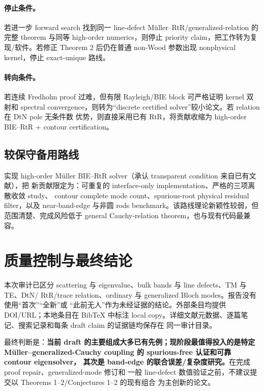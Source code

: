 \documentclass[UTF8,11pt,fontset=none]{ctexart}
\begin{document}
\paragraph{停止条件。}
若进一步 forward search 找到同一 line-defect Müller--RtR/generalized-relation 的完整
theorem 与同等 high-order numerics，则停止 priority claim，把工作转为复现/软件。若修正
Theorem 2 后仍在普通 non-Wood 参数出现 nonphysical kernel，停止 exact-unique 路线。

\paragraph{转向条件。}
若连续 Fredholm proof 过难，但有限 Rayleigh/BIE block 可严格证明 kernel 双射和 spectral
convergence，则转为“discrete certified solver”较小论文。若 relation 在 DtN pole 无条件数
优势，则直接采用已有 RtR，将贡献收缩为 high-order BIE--RtR + contour certification。

\subsection{较保守备用路线}

实现 high-order Müller BIE--RtR solver（承认 transparent condition 来自已有文献），把
新贡献限定为：可重复的 interface-only implementation、严格的三项离散收敛 study、
contour complete mode count、spurious-root physical residual filter，以及 near-band-edge
与非圆 rods benchmark。该路线理论新颖性较弱，但范围清楚、完成风险低于 general
Cauchy-relation theorem，也与现有代码最兼容。

\section{质量控制与最终结论}

本次审计已区分 scattering 与 eigenvalue、bulk bands 与 line defects、TM 与 TE、DtN/
RtR/trace relation、ordinary 与 generalized Bloch modes。报告没有使用“首次”“全新”或
“此前无人”作为未经证据的结论。外部条目均提供 DOI/URL；本地条目在 BibTeX 中标注
local copy。详细文献元数据、逐篇笔记、搜索记录和每条 draft claim 的证据链均保存在
同一审计目录。

最终判断是：\textbf{当前 draft 的主要组成大多已有先例；现阶段最值得投入的是特定
Müller--\allowbreak generalized-Cauchy coupling 的 spurious-free 认证和可靠 contour eigensolver，
其次是 band-edge 的联合误差/复杂度研究。}在完成 proof repair、generalized-mode 修订和
一般 line-defect 数值验证之前，不建议提交以 Theorems 1--2/Conjectures 1--2 的现有组合
为主创新的论文。

\clearpage
\printbibliography[heading=bibintoc,title={参考文献}]
\end{document}
